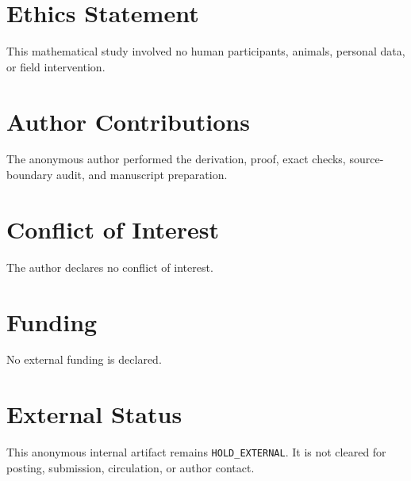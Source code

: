 \documentclass[a4paper,10pt]{amsart}
\begin{document}
\section*{Ethics Statement}
This mathematical study involved no human participants, animals, personal
data, or field intervention.

\section*{Author Contributions}
The anonymous author performed the derivation, proof, exact checks,
source-boundary audit, and manuscript preparation.

\section*{Conflict of Interest}
The author declares no conflict of interest.

\section*{Funding}
No external funding is declared.

\section*{External Status}
This anonymous internal artifact remains \texttt{HOLD\_EXTERNAL}.  It is not
cleared for posting, submission, circulation, or author contact.



\end{document}
